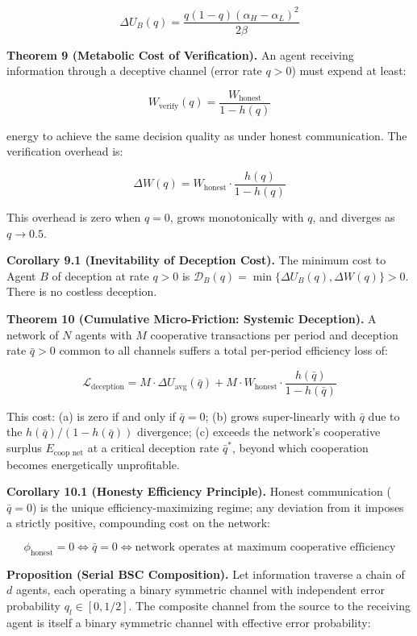 \documentclass[11pt]{article}
\begin{document}
\[\Delta U_B(q) = \frac{q(1 - q)(\alpha_H - \alpha_L)^2}{2\beta}\]

\textbf{Theorem 9 (Metabolic Cost of Verification).} An agent receiving
information through a deceptive channel (error rate \(q > 0\)) must
expend at least:

\[W_{\text{verify}}(q) = \frac{W_{\text{honest}}}{1 - h(q)}\]

energy to achieve the same decision quality as under honest
communication. The verification overhead is:

\[\Delta W(q) = W_{\text{honest}} \cdot \frac{h(q)}{1 - h(q)}\]

This overhead is zero when \(q = 0\), grows monotonically with \(q\),
and diverges as \(q \to 0.5\).

\textbf{Corollary 9.1 (Inevitability of Deception Cost).} The minimum
cost to Agent \(B\) of deception at rate \(q > 0\) is
\(\mathcal{D}_B(q) = \min\{\Delta U_B(q), \Delta W(q)\} > 0\). There is
no costless deception.

\textbf{Theorem 10 (Cumulative Micro-Friction: Systemic Deception).} A
network of \(N\) agents with \(M\) cooperative transactions per period
and deception rate \(\bar{q} > 0\) common to all channels suffers a
total per-period efficiency loss of:

\[\mathcal{L}_{\text{deception}} = M \cdot \Delta U_{\text{avg}}(\bar{q}) + M \cdot W_{\text{honest}} \cdot \frac{h(\bar{q})}{1 - h(\bar{q})}\]

This cost: (a) is zero if and only if \(\bar{q} = 0\); (b) grows
super-linearly with \(\bar{q}\) due to the
\(h(\bar{q})/(1 - h(\bar{q}))\) divergence; (c) exceeds the network's
cooperative surplus \(E_{\text{coop net}}\) at a critical deception rate
\(\bar{q}^*\), beyond which cooperation becomes energetically
unprofitable.

\textbf{Corollary 10.1 (Honesty Efficiency Principle).} Honest
communication (\(\bar{q} = 0\)) is the unique efficiency-maximizing
regime; any deviation from it imposes a strictly positive, compounding
cost on the network:

\[\phi_{\text{honest}} = 0 \iff \bar{q} = 0 \iff \text{network operates at maximum cooperative efficiency}\]

\textbf{Proposition (Serial BSC Composition).} Let information traverse
a chain of \(d\) agents, each operating a binary symmetric channel with
independent error probability \(q_l \in [0, 1/2]\). The composite
channel from the source to the receiving agent is itself a binary
symmetric channel with effective error probability:
\end{document}
